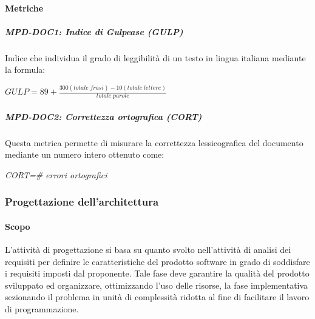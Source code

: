 \paragraph{Metriche} \label{_metricheDoc}

\subparagraph{MPD-DOC1: Indice di Gulpease (GULP)}
Indice che individua il grado di leggibilità di un testo in lingua italiana mediante la formula:
\begin{center}
    \(GULP=89+\frac{300(totale\; frasi)-10(totale\; lettere)}{totale\; parole}\)
\end{center}

\subparagraph{MPD-DOC2: Correttezza ortografica (CORT)}
Questa metrica permette di misurare la correttezza lessicografica del documento mediante un numero intero ottenuto come:
\begin{center}
    \textit{CORT=\# errori ortografici}
\end{center}




\subsubsection{Progettazione dell'architettura}
\paragraph{Scopo}
L'attività di progettazione si basa su quanto svolto nell'attività di analisi dei requisiti per definire le caratteristiche del prodotto software in grado di soddisfare i requisiti imposti dal proponente. Tale fase deve garantire la qualità del prodotto sviluppato ed organizzare, ottimizzando l'uso delle risorse, la fase implementativa sezionando il problema in unità di complessità ridotta al fine di facilitare il lavoro di programmazione.

